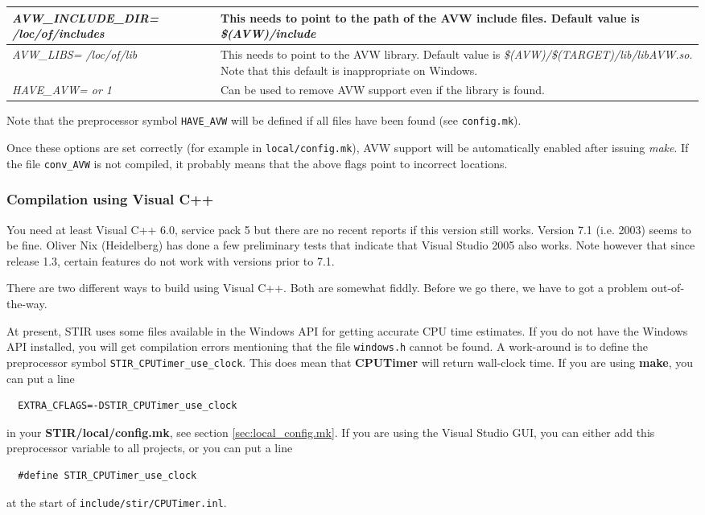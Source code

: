 \documentclass{article}
\begin{document}
\begin{longtable}{|p{\MakeTableFirstCol}|p{\MakeTableSecondCol}|}
\hline
\raggedright
\textit{AVW\_INCLUDE\_DIR=\linebreak
/loc/of/includes} &
This needs to point to the path of the AVW include files. Default 
value is \textit{\$(AVW)/include}\\
\hline
{\raggedright \textit{AVW\_LIBS= \linebreak
/loc/of/lib}} & 
{\raggedright This needs to point to the AVW library.
Default value is \textit{\$(AVW)/\$(TARGET)/lib/libAVW.so}.
Note that this default is inappropriate on Windows.} \\
\hline
{\raggedright \textit{HAVE\_AVW= \linebreak
0 or 1}} & 
Can be used to remove AVW support even if the library is found.\\
\hline
\end{longtable}
Note that the preprocessor symbol \texttt{HAVE\_AVW} will be defined 
if all files have been found (see \texttt{config.mk}).


Once these options are set correctly (for example in \texttt{local/config.mk}), 
AVW support will be automatically enabled after issuing \textit{make}. 
If the file \texttt{conv\_AVW} is not compiled, it probably 
means that the above flags point to incorrect locations.


\subsubsection{
Compilation using Visual C++}
\label{sec:VC}

You need at least Visual C++ 6.0, service pack 5 but there are no recent 
reports if this version still works. 
Version 7.1 (i.e. 2003) seems to be fine. 
Oliver Nix (Heidelberg) 
has done a few preliminary tests that indicate that Visual Studio 2005 also 
works. 
Note however that since release 1.3, certain features do not work 
with versions prior to 7.1.

There are two different ways to build using Visual C++. Both 
are somewhat fiddly. Before we go there, we have to got a problem out-of-the-way.

{ 
}
At present, STIR uses some files available in the Windows API for 
getting accurate CPU time estimates. If you do not have the Windows API
installed, you will get compilation errors mentioning that 
the file \texttt{windows.h} cannot be found. A work-around is to
define the preprocessor symbol \texttt{STIR\_CPUTimer\_use\_clock}. 
This does mean that \textbf{CPUTimer} will return wall-clock time.
If you are using \textbf{make}, you can put a line
\begin{verbatim}
  EXTRA_CFLAGS=-DSTIR_CPUTimer_use_clock
\end{verbatim}
in your \textbf{STIR/local/config.mk}, see section \ref{sec:local_config.mk}.
If you are using the Visual Studio GUI, you can either add this preprocessor
variable to all projects, or you can put a line
\begin{verbatim}
  #define STIR_CPUTimer_use_clock
\end{verbatim}
at the start of \texttt{include/stir/CPUTimer.inl}.
\end{document}
